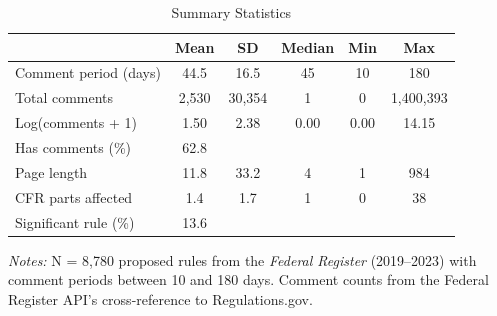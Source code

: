 \begin{table}[t]
\centering
\caption{Summary Statistics}
\label{tab:summary}
\begin{threeparttable}
\begin{tabular}{lccccc}
\toprule
 & Mean & SD & Median & Min & Max \\
\midrule
Comment period (days) & 44.5 & 16.5 & 45 & 10 & 180 \\
Total comments & 2,530 & 30,354 & 1 & 0 & 1,400,393 \\
Log(comments + 1) & 1.50 & 2.38 & 0.00 & 0.00 & 14.15 \\
Has comments (\%) & 62.8 & & & & \\
Page length & 11.8 & 33.2 & 4 & 1 & 984 \\
CFR parts affected & 1.4 & 1.7 & 1 & 0 & 38 \\
Significant rule (\%) & 13.6 & & & & \\
\bottomrule
\end{tabular}
\begin{tablenotes}
\small
\item \textit{Notes:} N = 8,780 proposed rules from the \textit{Federal Register} (2019--2023) with comment periods between 10 and 180 days. Comment counts from the Federal Register API's cross-reference to Regulations.gov.
\end{tablenotes}
\end{threeparttable}
\end{table}
